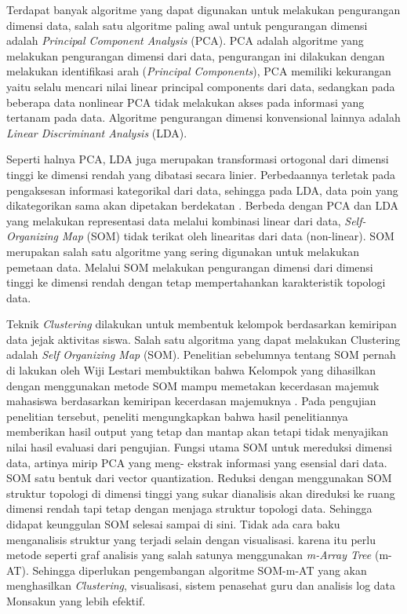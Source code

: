 Terdapat banyak algoritme yang dapat digunakan untuk melakukan pengurangan dimensi data, salah satu algoritme paling awal untuk pengurangan dimensi adalah \textit{Principal Component Analysis} (PCA). PCA adalah algoritme yang melakukan pengurangan dimensi dari data, pengurangan ini dilakukan dengan melakukan identifikasi arah (\textit{Principal Components}), PCA memiliki kekurangan yaitu selalu mencari nilai linear principal components dari data, sedangkan pada beberapa data nonlinear PCA tidak melakukan akses pada informasi yang tertanam pada data. Algoritme pengurangan dimensi konvensional lainnya adalah \textit{Linear Discriminant Analysis} (LDA).

Seperti halnya PCA, LDA juga merupakan transformasi ortogonal dari dimensi tinggi ke dimensi rendah yang dibatasi secara linier. Perbedaannya terletak pada pengaksesan informasi kategorikal dari data, sehingga pada LDA, data poin yang dikategorikan sama akan dipetakan berdekatan \cite{Hartono2017}. Berbeda 
dengan PCA dan LDA yang melakukan representasi data melalui kombinasi linear dari data,\textit{ Self-Organizing Map} (SOM) tidak terikat oleh linearitas dari data (non-linear). SOM merupakan salah satu algoritme yang sering digunakan untuk melakukan pemetaan data. Melalui SOM melakukan pengurangan dimensi dari dimensi tinggi ke dimensi rendah dengan tetap mempertahankan karakteristik topologi data.

Teknik \textit{Clustering} dilakukan untuk membentuk kelompok berdasarkan kemiripan data jejak aktivitas siswa. Salah satu algoritma yang dapat melakukan Clustering adalah \textit{Self Organizing Map} (SOM). Penelitian sebelumnya tentang SOM pernah di lakukan oleh Wiji Lestari membuktikan bahwa Kelompok yang dihasilkan dengan menggunakan metode SOM mampu memetakan kecerdasan majemuk mahasiswa berdasarkan kemiripan kecerdasan majemuknya \cite{Lestari2014}. Pada pengujian penelitian tersebut, peneliti mengungkapkan bahwa hasil penelitiannya memberikan hasil output yang tetap dan mantap akan tetapi tidak menyajikan nilai hasil evaluasi dari pengujian. Fungsi utama SOM untuk mereduksi dimensi data, artinya mirip PCA yang meng- ekstrak informasi yang esensial dari data. SOM satu bentuk dari vector quantization. Reduksi dengan menggunakan SOM struktur topologi di dimensi tinggi yang sukar dianalisis akan direduksi ke ruang dimensi rendah tapi tetap dengan menjaga struktur topologi data. Sehingga didapat keunggulan SOM selesai sampai di sini. Tidak ada cara baku menganalisis struktur yang terjadi selain dengan visualisasi. karena itu perlu metode seperti graf analisis yang salah satunya menggunakan \textit{m-Array Tree} (m-AT). Sehingga diperlukan pengembangan algoritme SOM-m-AT yang akan menghasilkan \textit{Clustering}, visualisasi, sistem penasehat guru dan analisis log data Monsakun yang lebih efektif.

